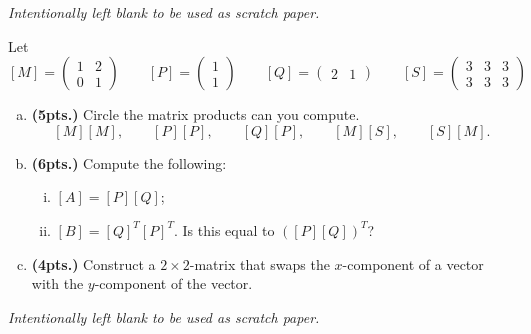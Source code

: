 \documentclass[12pt]{amsbook}
\begin{document}
\newpage
\emph{Intentionally left blank to be used as scratch paper.}\\


\newpage
\begin{problem} 
Let
\vspace*{.25cm}
\[
[M]= \begin{pmatrix} 1 & 2\\ 0 & 1 \end{pmatrix} \qquad 
[P]=\begin{pmatrix} 1 \\ 1 \end{pmatrix} \qquad 
[Q]=\begin{pmatrix} 2 & 1 \end{pmatrix} \qquad
[S]=\begin{pmatrix} 3 & 3 & 3 \\ 3 & 3 & 3 \end{pmatrix}
\]
\vspace*{.25cm}
\begin{enumerate}[(a)]
    \item \textbf{(5pts.)} Circle the matrix products can you compute.
    \vspace*{.75cm}
\[
[M][M], \qquad [P][P], \qquad [Q][P], \qquad [M][S], \qquad [S][M].
\]
\vspace*{.5cm}
    \item \textbf{(6pts.)} Compute the following:\\
    
    \begin{enumerate}[i.]
        \item $[A]=[P][Q]$;
        \item $[B]=[Q]^T[P]^T$. Is this equal to $([P][Q])^T$?
    \end{enumerate}
    \vspace*{7cm}
    \item \textbf{(4pts.)} Construct a $2\times 2$-matrix that swaps the $x$-component of a vector with the $y$-component of the vector.
\end{enumerate}

\end{problem}

\newpage
\emph{Intentionally left blank to be used as scratch paper.}\\
\end{document}
